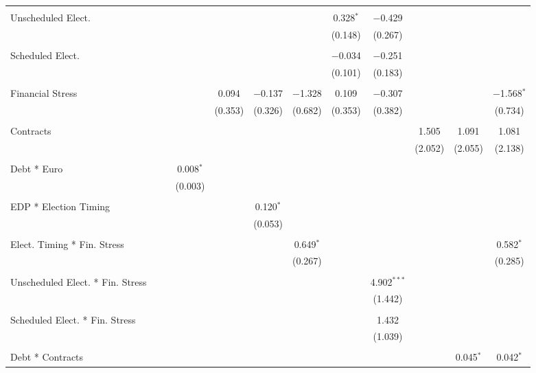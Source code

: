\begin{table}[!htbp]
\begin{tabular}{@{\extracolsep{5pt}}lccccccccccc}
  & & & & & & & & & & & \\ 
 Unscheduled Elect. &  &  &  &  &  &  & 0.328$^{*}$ & $-$0.429 &  &  &  \\ 
  &  &  &  &  &  &  & (0.148) & (0.267) &  &  &  \\ 
  & & & & & & & & & & & \\ 
 Scheduled Elect. &  &  &  &  &  &  & $-$0.034 & $-$0.251 &  &  &  \\ 
  &  &  &  &  &  &  & (0.101) & (0.183) &  &  &  \\ 
  & & & & & & & & & & & \\ 
 Financial Stress &  &  &  & 0.094 & $-$0.137 & $-$1.328 & 0.109 & $-$0.307 &  &  & $-$1.568$^{*}$ \\ 
  &  &  &  & (0.353) & (0.326) & (0.682) & (0.353) & (0.382) &  &  & (0.734) \\ 
  & & & & & & & & & & & \\ 
 Contracts &  &  &  &  &  &  &  &  & 1.505 & 1.091 & 1.081 \\ 
  &  &  &  &  &  &  &  &  & (2.052) & (2.055) & (2.138) \\ 
  & & & & & & & & & & & \\ 
 Debt * Euro &  &  & 0.008$^{*}$ &  &  &  &  &  &  &  &  \\ 
  &  &  & (0.003) &  &  &  &  &  &  &  &  \\ 
  & & & & & & & & & & & \\ 
 EDP * Election Timing &  &  &  &  & 0.120$^{*}$ &  &  &  &  &  &  \\ 
  &  &  &  &  & (0.053) &  &  &  &  &  &  \\ 
  & & & & & & & & & & & \\ 
 Elect. Timing * Fin. Stress &  &  &  &  &  & 0.649$^{*}$ &  &  &  &  & 0.582$^{*}$ \\ 
  &  &  &  &  &  & (0.267) &  &  &  &  & (0.285) \\ 
  & & & & & & & & & & & \\ 
 Unscheduled Elect. * Fin. Stress &  &  &  &  &  &  &  & 4.902$^{***}$ &  &  &  \\ 
  &  &  &  &  &  &  &  & (1.442) &  &  &  \\ 
  & & & & & & & & & & & \\ 
 Scheduled Elect. * Fin. Stress &  &  &  &  &  &  &  & 1.432 &  &  &  \\ 
  &  &  &  &  &  &  &  & (1.039) &  &  &  \\ 
  & & & & & & & & & & & \\ 
 Debt * Contracts &  &  &  &  &  &  &  &  &  & 0.045$^{*}$ & 0.042$^{*}$ \\ 

\end{tabular}
\end{table}
